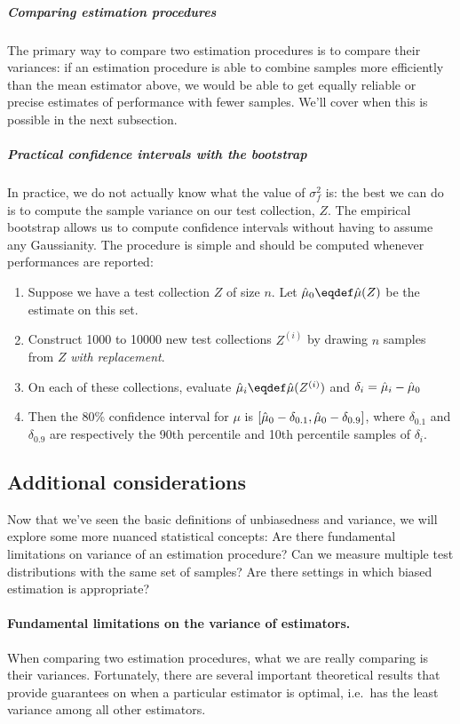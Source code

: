 \subparagraph{Comparing estimation procedures}
The primary way to compare two estimation procedures is to compare their variances: if an estimation procedure is able to combine samples more efficiently than the mean estimator above, we would be able to get equally reliable or precise estimates of performance with fewer samples.
We'll cover when this is possible in the next subsection.

\subparagraph{Practical confidence intervals with the bootstrap}
In practice, we do not actually know what the value of $\sigma^2_f$ is: the best we can do is to compute the sample variance on our test collection, $Z$.
The empirical bootstrap allows us to compute confidence intervals without having to assume any Gaussianity.
The procedure is simple and should be computed whenever performances are reported:
\begin{enumerate}
  \item Suppose we have a test collection $Z$ of size $n$. Let $\muh_0 \eqdef \muh(Z)$ be the estimate on this set.
  \item Construct 1000 to 10000 new test collections $Z^{(i)}$ by drawing $n$ samples from $Z$ \textit{with replacement}.
  \item On each of these collections, evaluate $\muh_{i} \eqdef \muh(Z^{(i)})$ and $\delta_i = \hat{\mu}_i - \hat{\mu}_0$
  \item Then the 80\% confidence interval for $\mu$ is $[\hat{\mu}_0 - \delta_{0.1}, \hat{\mu}_0 - \delta_{0.9}]$, where $\delta_{0.1}$ and $\delta_{0.9}$ are respectively the 90th percentile and 10th percentile samples of $\delta_i$. 
\end{enumerate}

\subsection{Additional considerations}
Now that we've seen the basic definitions of unbiasedness and variance, we will explore some more nuanced statistical concepts:
  Are there fundamental limitations on variance of an estimation procedure?
  Can we measure multiple test distributions with the same set of samples?
  Are there settings in which biased estimation is appropriate? 

\paragraph{Fundamental limitations on the variance of estimators.}
When comparing two estimation procedures, what we are really comparing is their variances.
Fortunately, there are several important theoretical results that provide guarantees on when a particular estimator is optimal, i.e.\ has the least variance among all other estimators.


